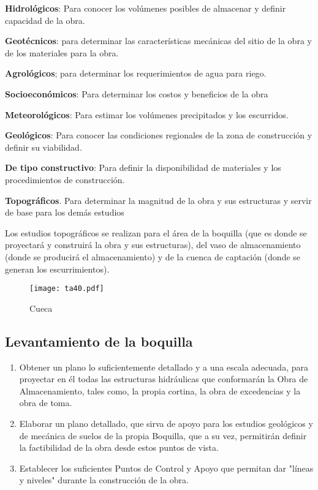 \textbf{Hidrológicos}: Para conocer los volúmenes posibles de almacenar y definir capacidad de la obra.

\textbf{Geotécnicos}: para determinar las características mecánicas del sitio de la obra y de los materiales para la obra.

\textbf{Agrológicos}; para determinar los requerimientos de agua para riego.

\textbf{Socioeconómicos}: Para determinar los costos y beneficios de la obra

\textbf{Meteorológicos}: Para estimar los volúmenes precipitados y los escurridos.

\textbf{Geológicos}: Para conocer las condiciones regionales de la zona de construcción y definir su viabilidad.

\textbf{De tipo constructivo}: Para definir la disponibilidad de materiales y los procedimientos de construcción.

\textbf{Topográficos}. Para determinar la magnitud de la obra y sus estructuras y servir de base para los demás estudios

Los estudios topográficos se realizan para el área de la boquilla (que es donde se proyectará y construirá la obra y sus estructuras), del vaso de almacenamiento (donde se producirá el almacenamiento) y de la cuenca de captación (donde se generan los escurrimientos).

\begin{figure}[h!]
    \centering
      \texttt{[image: ta40.pdf]}
      \caption{Cueca}
      \label{ta40}
\end{figure}

\subsection{Levantamiento de la boquilla}

\begin{enumerate}
    \item Obtener un plano lo suficientemente detallado y a una escala adecuada, para proyectar en él todas las estructuras hidráulicas que conformarán la Obra de Almacenamiento, tales como, la propia cortina, la obra de excedencias y la obra de toma.
    \item  Elaborar un plano detallado, que sirva de apoyo para los estudios geológicos y de mecánica de suelos de la propia Boquilla, que a su vez, permitirán definir la factibilidad de la obra desde estos puntos de vista.
    \item  Establecer los suficientes Puntos de Control y Apoyo que permitan dar "líneas y niveles" durante la construcción de la obra.
\end{enumerate}

